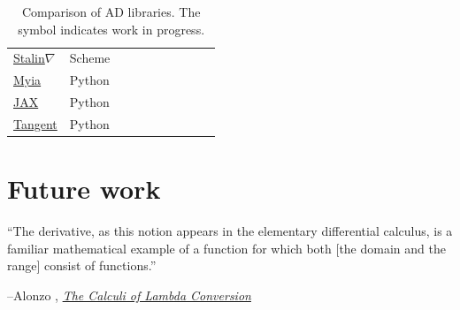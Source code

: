 \documentclass[12pt,initial,twoside,maitrise]{dms}
\newcommand{\wmark}{\textcolor{orange}{\ding{45}}}
\newcommand{\cmark}{\textcolor{green!80!black}{\ding{51}}}
\newcommand{\xmark}{\textcolor{red}{\ding{55}}}
\numberwithin{equation}{section}
\numberwithin{table}{chapter}
\numberwithin{figure}{chapter}
\begin{document}
\begin{table}
\begin{tabular}{llllllllll}
\href{https://github.com/Functional-AutoDiff/STALINGRAD}{Stalin$\nabla$}         & Scheme  & \xmark & \cmark & \xmark & \xmark & \xmark & \xmark & \xmark & \xmark \\
\href{https://github.com/mila-iqia/myia}{Myia}                                   & Python  & \cmark & \cmark & \cmark & \cmark & \xmark & \xmark & \xmark & \wmark \\
\href{https://github.com/google/jax}{JAX}                                        & Python  & \xmark & \cmark & \cmark & \cmark & \xmark & \xmark & \xmark & \wmark \\
\href{https://github.com/google/tangent}{Tangent}                                & Python  & \xmark & \cmark & \xmark & \xmark & \xmark & \xmark & \xmark & \xmark \\

\end{tabular}
\caption{\label{tab:ad_comparison} Comparison of AD libraries. The \wmark symbol indicates work in progress.}
\end{table}

\vspace{-20pt}\section{Future work}\label{sec:future-work}


\vspace{2pt}\setlength{\epigraphwidth}{0.65\textwidth}
\epigraph{``The derivative, as this notion appears in the elementary differential calculus, is a familiar mathematical example of a function for which both [the domain and the range] consist of functions.''}{\begin{flushright}--Alonzo \citet{church1941calculi}, \href{https://archive.org/details/AnnalsOfMathematicalStudies6ChurchAlonzoTheCalculiOfLambdaConversionPrincetonUniversityPress1941}{\textit{The Calculi of Lambda Conversion}}\end{flushright}}
\end{document}
